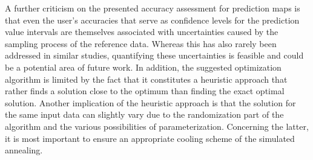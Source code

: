 A further criticism on the presented accuracy assessment for prediction maps is that even the user's accuracies that serve as confidence levels for the prediction value intervals are themselves associated with uncertainties caused by the sampling process of the reference data. Whereas this has also rarely been addressed in similar studies, quantifying these uncertainties is feasible and could be a potential area of future work. In addition, the suggested optimization algorithm is limited by the fact that it constitutes a heuristic approach that rather finds a solution close to the optimum than finding the exact optimal solution. Another implication of the heuristic approach is that the solution for the same input data can slightly vary due to the randomization part of the algorithm and the various possibilities of parameterization. Concerning the latter, it is most important to ensure an appropriate cooling scheme of the simulated annealing.


